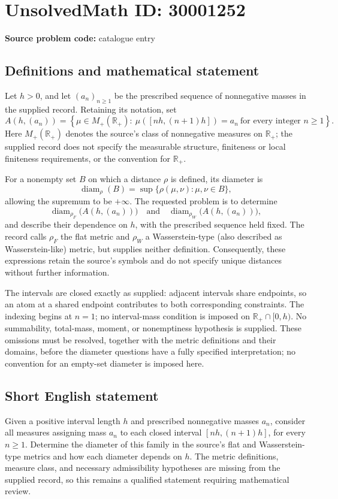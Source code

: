 \documentclass[11pt]{article}
\newcommand{\R}{\mathbb{R}}
\begin{document}
\section*{UnsolvedMath ID: 30001252}
\textbf{Source problem code:} catalogue entry
\subsection{Definitions and mathematical statement}
Let \(h>0\), and let \((a_n)_{n\geq1}\) be the prescribed sequence of nonnegative masses in the supplied record. Retaining its notation, set
\[
A(h,(a_n))=\left\{\mu\in M_+(\R_+):\ \mu([nh,(n+1)h])=a_n\ \text{for every integer }n\geq1\right\}.
\]
Here \(M_+(\R_+)\) denotes the source's class of nonnegative measures on \(\R_+\); the supplied record does not specify the measurable structure, finiteness or local finiteness requirements, or the convention for \(\R_+\).

For a nonempty set \(B\) on which a distance \(\rho\) is defined, its diameter is
\[
\operatorname{diam}_{\rho}(B)=\sup\{\rho(\mu,\nu):\mu,\nu\in B\},
\]
allowing the supremum to be \(+\infty\). The requested problem is to determine
\[
\operatorname{diam}_{\rho_F}\bigl(A(h,(a_n))\bigr)
\quad\text{and}\quad
\operatorname{diam}_{\rho_W}\bigl(A(h,(a_n))\bigr),
\]
and describe their dependence on \(h\), with the prescribed sequence held fixed. The record calls \(\rho_F\) the flat metric and \(\rho_W\) a Wasserstein-type (also described as Wasserstein-like) metric, but supplies neither definition. Consequently, these expressions retain the source's symbols and do not specify unique distances without further information.

The intervals are closed exactly as supplied: adjacent intervals share endpoints, so an atom at a shared endpoint contributes to both corresponding constraints. The indexing begins at \(n=1\); no interval-mass condition is imposed on \(\R_+\cap[0,h)\). No summability, total-mass, moment, or nonemptiness hypothesis is supplied. These omissions must be resolved, together with the metric definitions and their domains, before the diameter questions have a fully specified interpretation; no convention for an empty-set diameter is imposed here.
\subsection{Short English statement}
Given a positive interval length \(h\) and prescribed nonnegative masses \(a_n\), consider all measures assigning mass \(a_n\) to each closed interval \([nh,(n+1)h]\), for every \(n\geq1\). Determine the diameter of this family in the source's flat and Wasserstein-type metrics and how each diameter depends on \(h\). The metric definitions, measure class, and necessary admissibility hypotheses are missing from the supplied record, so this remains a qualified statement requiring mathematical review.
\end{document}
